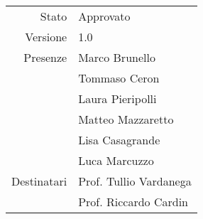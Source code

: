 \begin{center}
\begin{tabular}{r|l}
	Stato & Approvato \\
	Versione & 1.0 \\
	Presenze & Marco Brunello \\
	         & Tommaso Ceron \\
	         & Laura Pieripolli \\
	         & Matteo Mazzaretto \\
	         & Lisa Casagrande \\
	         & Luca Marcuzzo \\
	Destinatari & Prof. Tullio Vardanega \\
	            & Prof. Riccardo Cardin
\end{tabular}
\end{center}